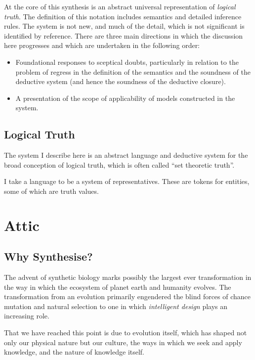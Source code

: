 \documentclass[10pt,titlepage]{book}
\begin{document}
At the core of this synthesis is an abstract universal representation of \emph{logical truth}.
The definition of this notation includes semantics and detailed inference rules.
The system is not new, and much of the detail, which is not significant is identified by reference.
There are three main directions in which the discussion here progresses and which are undertaken in the following order:

\begin{itemize}
\item Foundational responses to sceptical doubts, particularly in relation to the problem of regress in the definition of the semantics and the soundness of the deductive system (and hence the soundness of the deductive closure).
  
\item A presentation of the scope of applicability of models constructed in the system.

\end{itemize}

\section{Logical Truth}

The system I describe here is an abstract language and deductive system for the broad conception of logical truth, which is often called ``set theoretic truth''.

I take a language to be a system of representatives.
These are tokens for entities, some of which are truth values.





\chapter{Attic}

\section{Why Synthesise?}

The advent of synthetic biology marks possibly the largest ever transformation in the way in which the ecosystem of planet earth and humanity evolves.
The transformation from an evolution primarily engendered the blind forces of chance mutation and natural selection to one in which \emph{intelligent design} plays an increasing role.

That we have reached this point is due to evolution itself, which has shaped not only our physical nature but our culture, the ways in which we seek and apply knowledge, and the nature of knowledge itself.
\end{document}
